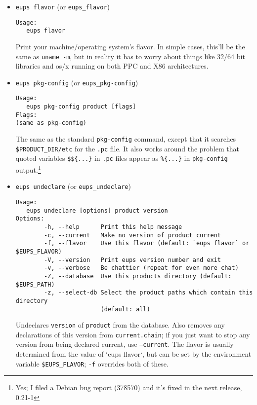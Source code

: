 \documentclass{article}
\newcommand{\code}[1]{\texttt{#1}}
\begin{document}
\begin{itemize}
\item \code{eups flavor} (or \code{eups\_flavor})
\begin{verbatim}
Usage:
   eups flavor
\end{verbatim}
  
Print your machine/operating system's flavor.  In simple cases, this'll
be the same as \code{uname -m}, but in reality it has to worry about things
like 32/64 bit libraries and os/x running on both PPC and X86 architectures.


\item \code{eups pkg-config} (or \code{eups\_pkg-config})
\begin{verbatim}
Usage:
   eups pkg-config product [flags]
Flags:
(same as pkg-config)
\end{verbatim}

The same as the standard \code{pkg-config} command, except that it
searches \code{\$PRODUCT\_DIR/etc} for the \code{.pc} file.  It also
works around the problem that quoted variables \code{\$\$\{...\}}
in \code{.pc} files appear as \code{\%\{...\}} in \code{pkg-config} output.\footnote{
  Yes; I filed a Debian bug report (378570) and it's fixed in the next release, 0.21-1}
  

  \item \code{eups undeclare} (or \code{eups\_undeclare})
\begin{verbatim}
Usage:
   eups undeclare [options] product version
Options:
        -h, --help      Print this help message
        -c, --current   Make no version of product current
        -f, --flavor    Use this flavor (default: `eups flavor` or $EUPS_FLAVOR)
        -V, --version   Print eups version number and exit
        -v, --verbose   Be chattier (repeat for even more chat)
        -Z, --database  Use this products directory (default: $EUPS_PATH)
        -z, --select-db Select the product paths which contain this directory 
                        (default: all)
\end{verbatim}
  
Undeclares \code{version} of \code{product} from the database. Also
removes any declarations of this version from \code{current.chain}; if
you just want to stop any version from being declared current, use
\code{--current}. The flavor is usually determined from the value
of `eups flavor`, but can be set by the
environment variable \code{\$EUPS\_FLAVOR}; \code{-f} overrides
both of these.


\end{itemize}
\end{document}
